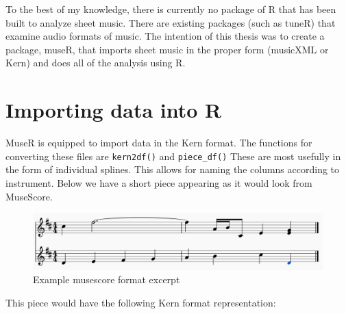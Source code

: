 \documentclass[12pt,twoside]{reedthesis}
\theoremstyle{definition}
\theoremstyle{definition}
\theoremstyle{definition}
\theoremstyle{remark}
\begin{document}
To the best of my knowledge, there is currently no package of R that has
been built to analyze sheet music. There are existing packages (such as
tuneR) that examine audio formats of music. The intention of this thesis
was to create a package, museR, that imports sheet music in the proper
form (musicXML or Kern) and does all of the analysis using R.

\section{Importing data into R}\label{importing-data-into-r}

MuseR is equipped to import data in the Kern format. The functions for
converting these files are \texttt{kern2df()} and \texttt{piece\_df()}
These are most usefully in the form of individual splines. This allows
for naming the columns according to instrument. Below we have a short
piece appearing as it would look from MuseScore.
\begin{figure}[h]
\centering
\includegraphics[scale = .5]{images/ex1m.png}
\caption{Example musescore format excerpt}
\label{subd}
\end{figure}
This piece would have the following Kern format representation:
\end{document}
